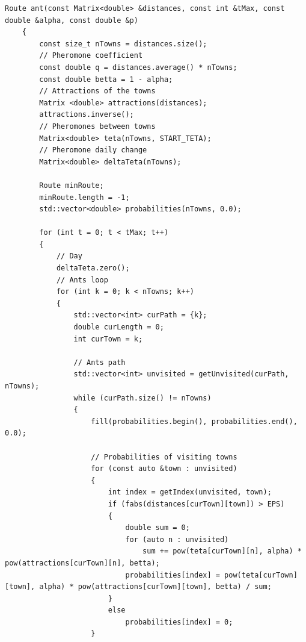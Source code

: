 \documentclass[a4paper,12pt]{report}
\begin{document}
\begin{lstlisting}[caption=Функция муравьиного поиска кратчайшего пути]
    Route ant(const Matrix<double> &distances, const int &tMax, const double &alpha, const double &p)
    {
        const size_t nTowns = distances.size();
        // Pheromone coefficient
        const double q = distances.average() * nTowns;
        const double betta = 1 - alpha;
        // Attractions of the towns
        Matrix <double> attractions(distances);
        attractions.inverse();
        // Pheromones between towns
        Matrix<double> teta(nTowns, START_TETA);
        // Pheromone daily change
        Matrix<double> deltaTeta(nTowns);
    
        Route minRoute;
        minRoute.length = -1;
        std::vector<double> probabilities(nTowns, 0.0);
    
        for (int t = 0; t < tMax; t++)
        {
            // Day
            deltaTeta.zero();
            // Ants loop
            for (int k = 0; k < nTowns; k++)
            {
                std::vector<int> curPath = {k};
                double curLength = 0;
                int curTown = k;
    
                // Ants path
                std::vector<int> unvisited = getUnvisited(curPath, nTowns);
                while (curPath.size() != nTowns)
                {
                    fill(probabilities.begin(), probabilities.end(), 0.0);
    
                    // Probabilities of visiting towns
                    for (const auto &town : unvisited)
                    {
                        int index = getIndex(unvisited, town);
                        if (fabs(distances[curTown][town]) > EPS)
                        {
                            double sum = 0;
                            for (auto n : unvisited)
                                sum += pow(teta[curTown][n], alpha) * pow(attractions[curTown][n], betta);
                            probabilities[index] = pow(teta[curTown][town], alpha) * pow(attractions[curTown][town], betta) / sum;
                        }
                        else
                            probabilities[index] = 0;
                    }
    

\end{lstlisting}
\end{document}
